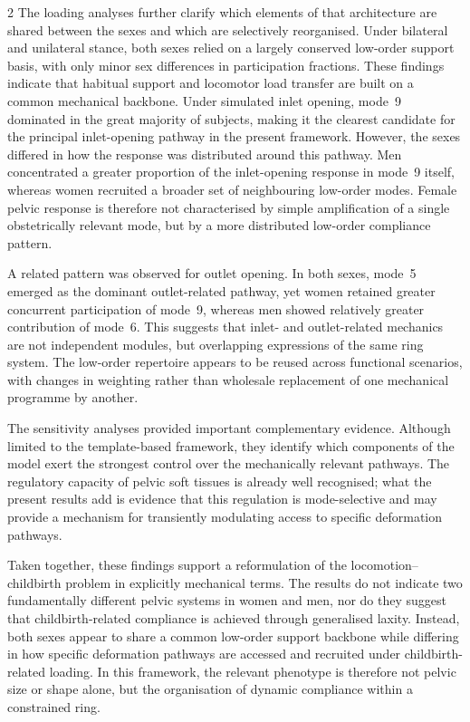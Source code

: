 \documentclass[openacc]{rsproca_new}
\begin{document}
\begin{multicols}{2}
The loading analyses further clarify which elements of that architecture are shared between the sexes and which are selectively reorganised. Under bilateral and unilateral stance, both sexes relied on a largely conserved low-order support basis, with only minor sex differences in participation fractions. These findings indicate that habitual support and locomotor load transfer are built on a common mechanical backbone. Under simulated inlet opening, mode~9 dominated in the great majority of subjects, making it the clearest candidate for the principal inlet-opening pathway in the present framework. However, the sexes differed in how the response was distributed around this pathway. Men concentrated a greater proportion of the inlet-opening response in mode~9 itself, whereas women recruited a broader set of neighbouring low-order modes. Female pelvic response is therefore not characterised by simple amplification of a single obstetrically relevant mode, but by a more distributed low-order compliance pattern.

A related pattern was observed for outlet opening. In both sexes, mode~5 emerged as the dominant outlet-related pathway, yet women retained greater concurrent participation of mode~9, whereas men showed relatively greater contribution of mode~6. This suggests that inlet- and outlet-related mechanics are not independent modules, but overlapping expressions of the same ring system. The low-order repertoire appears to be reused across functional scenarios, with changes in weighting rather than wholesale replacement of one mechanical programme by another.

The sensitivity analyses provided important complementary evidence. Although limited to the template-based framework, they identify which components of the model exert the strongest control over the mechanically relevant pathways. The regulatory capacity of pelvic soft tissues is already well recognised; what the present results add is evidence that this regulation is mode-selective and may provide a mechanism for transiently modulating access to specific deformation pathways.

Taken together, these findings support a reformulation of the locomotion--childbirth problem in explicitly mechanical terms. The results do not indicate two fundamentally different pelvic systems in women and men, nor do they suggest that childbirth-related compliance is achieved through generalised laxity. Instead, both sexes appear to share a common low-order support backbone while differing in how specific deformation pathways are accessed and recruited under childbirth-related loading. In this framework, the relevant phenotype is therefore not pelvic size or shape alone, but the organisation of dynamic compliance within a constrained ring.


\end{multicols}
\end{document}

